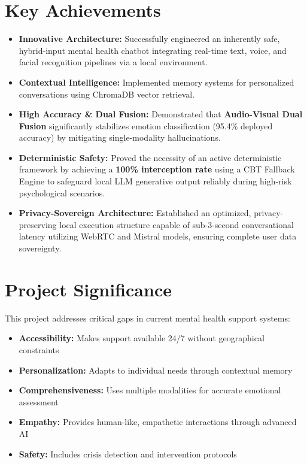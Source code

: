 \documentclass[11pt]{report}
\begin{document}
\section{Key Achievements}
\begin{itemize}
    \item \textbf{Innovative Architecture:} Successfully engineered an inherently safe, hybrid-input mental health chatbot integrating real-time text, voice, and facial recognition pipelines via a local environment.
    \item \textbf{Contextual Intelligence:} Implemented memory systems for personalized conversations using ChromaDB vector retrieval.
    \item \textbf{High Accuracy \& Dual Fusion:} Demonstrated that \textbf{Audio-Visual Dual Fusion} significantly stabilizes emotion classification (95.4\% deployed accuracy) by mitigating single-modality hallucinations.
    \item \textbf{Deterministic Safety:} Proved the necessity of an active deterministic framework by achieving a \textbf{100\% interception rate} using a CBT Fallback Engine to safeguard local LLM generative output reliably during high-risk psychological scenarios.
    \item \textbf{Privacy-Sovereign Architecture:} Established an optimized, privacy-preserving local execution structure capable of sub-3-second conversational latency utilizing WebRTC and Mistral models, ensuring complete user data sovereignty.
\end{itemize}

\section{Project Significance}
This project addresses critical gaps in current mental health support systems:
\begin{itemize}
    \item \textbf{Accessibility:} Makes support available 24/7 without geographical constraints
    \item \textbf{Personalization:} Adapts to individual needs through contextual memory
    \item \textbf{Comprehensiveness:} Uses multiple modalities for accurate emotional assessment
    \item \textbf{Empathy:} Provides human-like, empathetic interactions through advanced AI
    \item \textbf{Safety:} Includes crisis detection and intervention protocols
\end{itemize}
\end{document}
